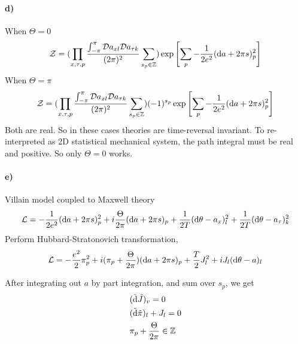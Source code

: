 \documentclass[a4paper,11pt]{article}
\begin{document}
\paragraph{d)}
When $\Theta = 0$
\begin{equation}
    \mathcal{Z} = (\prod_{x,\tau, p} \frac{\int_{-\pi}^{\pi} {\mathcal{D}} a_{xl} {\mathcal{D}}  a_{\tau k}}{(2\pi)^2} \sum_{s_p \in \mathbb{Z}})
    \exp \left[\sum_{p} - \frac{1}{2e^2 }
    ({\rm d}a + 2\pi s)_p^2
    \right]
\end{equation}
When $\Theta = \pi$
\begin{equation}
    \mathcal{Z} = (\prod_{x,\tau, p} \frac{\int_{-\pi}^{\pi} {\mathcal{D}} a_{xl} {\mathcal{D}}  a_{\tau k}}{(2\pi)^2} \sum_{s_p \in \mathbb{Z}})
    (-1)^{s_p}\exp \left[\sum_{p} - \frac{1}{2e^2 }
    ({\rm d}a + 2\pi s)_p^2
    \right]
\end{equation}
Both are real. So in these cases theories are time-reversal invariant. To re-interpreted as 2D statistical mechanical system, the path integral must be real and positive. So only $\Theta = 0$ works.

\paragraph{e)}
Villain model coupled to Maxwell theory
\begin{equation}
    \mathcal{L} 
    = - \frac{1}{2e^2 }({\rm d}a + 2\pi s)_p^2
    + i\frac{\Theta}{2\pi} ({\rm d}a + 2\pi s)_p
    + \frac{1}{2T}({\rm d}\theta - a_{x})_l^2 
    + \frac{1}{2T}({\rm d}\theta - a_{\tau})_k^2
\end{equation}
Perform Hubbard-Stratonovich transformation,
\begin{equation}
    \mathcal{L} = 
    -\frac{e^2}{2} \pi_p^2 + i(\pi_p + \frac{\Theta}{2\pi})({\rm d}a+2\pi s)_p
    + \frac{T}{2} J_l^2 + iJ_l ({\rm d}\theta - a)_l 
\end{equation}

After integrating out $a$ by part integration, and sum over $s_p$, we get 
\begin{equation}
    \begin{aligned}
        & (\tilde{\rm d} \tilde{J})_v = 0 \\
        & (\tilde{\rm d} \tilde{\pi})_l + J_l = 0\\
        & \pi_p + \frac{\Theta}{2\pi} \in \mathbb{Z}
    \end{aligned}
\end{equation}
\end{document}
